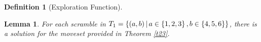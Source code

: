 \documentclass[a4paper,twoside,12pt,openany]{report}
\theoremstyle{plain}
\newtheorem{lemma}{Lemma}
\theoremstyle{definition}
\newtheorem{definition}{Definition}
\theoremstyle{remark}
\begin{document}
\begin{definition}[Exploration Function]

\begin{lemma}\label{tl1}
	For each scramble in \(T_1=\left\{ (a,b) \,\middle|\, a\in\left\{ 1,2,3 \right\},b\in\left\{ 4,5,6 \right\} \right\}\), there is a solution for the moveset provided in Theorem \ref{t23}.
\end{lemma}


\end{definition}
\end{document}
